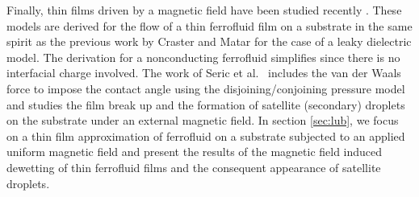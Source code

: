 Finally, thin films driven by a magnetic field have been studied recently \cite{Seric2014,Conroy2015}. 
These models are derived for the flow of a thin ferrofluid film on a substrate in the same 
spirit as the previous work by Craster and  Matar \cite{Craster2005} for the case of a leaky 
dielectric model. The derivation for a nonconducting ferrofluid simplifies since there is no interfacial
charge involved. The work of Seric et al.~\cite{Seric2014} includes 
the van der Waals force to impose the contact angle using the disjoining/conjoining pressure model
and studies the film break up and the formation of satellite (secondary) droplets on 
the substrate under an external magnetic field. In section \ref{sec:lub}, we focus on  
a thin film approximation of ferrofluid on a substrate subjected
to an applied uniform magnetic field and present the results of 
the magnetic field induced dewetting of thin ferrofluid films and the consequent 
appearance of satellite droplets. 
\FloatBarrier
